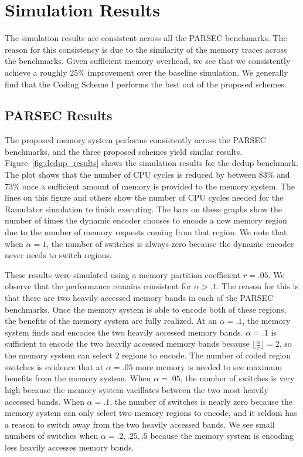 \section{Simulation Results}
\label{sec:simulation}
The simulation results are consistent across all the PARSEC benchmarks. The reason for this consistency is due to the similarity of the memory traces across the benchmarks. Given sufficient memory overhead, we see that we consistently achieve a roughly 25\% improvement over the baseline simulation. We generally find that the Coding Scheme I performs the best out of the proposed schemes. 

\subsection{PARSEC Results}

The proposed memory system performs consistently across the PARSEC benchmarks, and the three proposed schemes yield similar results. Figure~\ref{fig:dedup_results} shows the simulation results for the dedup benchmark. The plot shows that the number of CPU cycles is reduced by between 83\% and 73\% once a sufficient amount of memory is provided to the memory system. The lines on this figure and others show the number of CPU cycles needed for the Ramulator simulation to finish executing. The bars on these graphs show the number of times the dynamic encoder chooses to encode a new memory region due to the number of memory requests coming from that region. We note that when $\alpha = 1$, the number of switches is always zero because the dynamic encoder never needs to switch regions.

These results were simulated using a memory partition coefficient $r = .05$. We observe that the performance remains consistent for $\alpha > .1$. The reason for this is that there are two heavily accessed memory bands in each of the PARSEC benchmarks. Once the memory system is able to encode both of these regions, the benefits of the memory system are fully realized. At an $\alpha = .1$, the memory system finds and encodes the two heavily accessed memory bands. $\alpha = .1$ is sufficient to encode the two heavily accessed memory bands because $\lfloor\frac{\alpha}{r}\rfloor = 2$, so the memory system can select 2 regions to encode. The number of coded region switches is evidence that at $\alpha = .05$ more memory is needed to see maximum benefits from the memory system. When $\alpha = .05$, the number of switches is very high because the memory system vacillates between the two most heavily accessed bands. When $\alpha = .1$, the number of switches is nearly zero because the memory system can only select two memory regions to encode, and it seldom has a reason to switch away from the two heavily accessed bands. We see small numbers of switches when $\alpha = {.2, .25, .5}$ because the memory system is encoding less heavily accesses memory bands.

